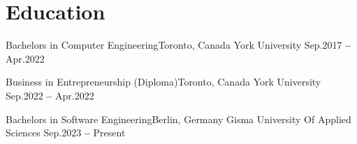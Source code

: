 \section*{Education}
\resumeSubHeadingListStart

\resumeSubheading
{Bachelors in Computer Engineering}{Toronto, Canada}
{York University}
{Sep.\@ 2017 \textbf{--} Apr.\@ 2022} 

\vspace{0.5em} %

\resumeSubheading
{Business in Entrepreneurship (Diploma)}{Toronto, Canada}
{York University}
{Sep.\@ 2022 \textbf{--} Apr.\@ 2022}

\vspace{0.5em}

\resumeSubheading
{Bachelors in Software Engineering}{Berlin, Germany}
{Gisma University Of Applied Sciences}
{Sep.\@ 2023 \textbf{--} Present}

\resumeSubHeadingListEnd


